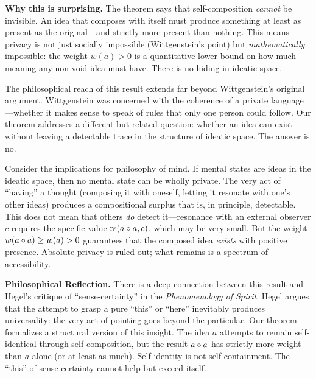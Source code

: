 \begin{surprisebox}
\textbf{Why this is surprising.} The theorem says that self-composition
\emph{cannot} be invisible. An idea that composes with itself must
produce something at least as present as the original---and strictly
more present than nothing. This means privacy is not just socially
impossible (Wittgenstein's point) but \emph{mathematically} impossible:
the weight $w(a) > 0$ is a quantitative lower bound on how much meaning
any non-void idea must have. There is no hiding in ideatic space.
\end{surprisebox}

The philosophical reach of this result extends far beyond Wittgenstein's
original argument. Wittgenstein was concerned with the coherence of a
private language---whether it makes sense to speak of rules that only one
person could follow. Our theorem addresses a different but related
question: whether an idea can exist without leaving a detectable trace
in the structure of ideatic space. The answer is no.

Consider the implications for philosophy of mind. If mental states are
ideas in the ideatic space, then no mental state can be wholly private.
The very act of ``having'' a thought (composing it with oneself, letting
it resonate with one's other ideas) produces a compositional surplus that
is, in principle, detectable. This does not mean that others \emph{do}
detect it---resonance with an external observer $c$ requires the specific
value $\mathrm{rs}(a \circ a, c)$, which may be very small. But the weight
$w(a \circ a) \geq w(a) > 0$ guarantees that the composed idea
\emph{exists} with positive presence. Absolute privacy is ruled out;
what remains is a spectrum of accessibility.

\begin{reflectionbox}
\textbf{Philosophical Reflection.}
There is a deep connection between this result and Hegel's critique of
``sense-certainty'' in the \textit{Phenomenology of Spirit}. Hegel argues
that the attempt to grasp a pure ``this'' or ``here'' inevitably produces
universality: the very act of pointing goes beyond the particular. Our
theorem formalizes a structural version of this insight. The idea $a$
attempts to remain self-identical through self-composition, but the
result $a \circ a$ has strictly more weight than $a$ alone (or at
least as much). Self-identity is not self-containment. The ``this'' of
sense-certainty cannot help but exceed itself.
\end{reflectionbox}

